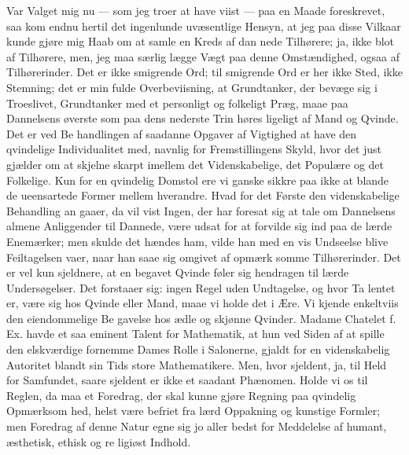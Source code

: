 \documentclass[12pt]{book}
\newcommand{\opage}[1]{\marginnote{\footnotesize\textit{[#1]}}}
\begin{document}
Var Valget mig nu --- som jeg troer at have viist
--- paa en Maade foreskrevet, saa kom endnu hertil det
ingenlunde uvæsentlige Hensyn, at jeg paa disse Vilkaar
kunde gjøre mig Haab om at samle en Kreds af dan\-%
nede Tilhørere; ja, ikke blot af Tilhørere, men,
jeg maa særlig lægge Vægt paa denne Omstændighed,
ogsaa af Tilhørerinder. Det er ikke smigrende Ord; til
smigrende Ord er her ikke Sted, ikke Stemning; det er min
fulde Overbeviisning, at Grundtanker, der bevæge sig i
Troeslivet, Grundtanker med et personligt og folkeligt
Præg, maae paa Dannelsens øverste som paa dens nederste
Trin høres ligeligt af Mand og Qvinde. Det er ved Be\-%
handlingen af saadanne Opgaver af Vigtighed at have den
qvindelige Individualitet med, navnlig for Fremstillingens
Skyld, hvor det just gjælder om at skjelne skarpt imellem
det Videnskabelige, det Populære og det Folkelige. Kun
for en qvindelig Domstol ere vi ganske sikkre paa ikke
at blande de ueensartede Former mellem hverandre.
Hvad for det Første den videnskabelige Behandling an\-%
gaaer, da vil vist Ingen, der har foresat sig at tale om
Dannelsens almene Anliggender til Dannede, være udsat
for at forvilde sig ind paa de lærde Enemærker; men skulde
det hændes ham, vilde han med en vis Undseelse blive
Feiltagelsen vaer, naar han saae sig omgivet af opmærk\-%
somme Tilhørerinder. Det er vel kun sjeldnere, at en
begavet Qvinde føler sig hendragen til lærde Undersøgelser.
Det forstaaer sig: ingen Regel uden Undtagelse, og hvor Ta\-%
lentet er, være sig hos Qvinde eller Mand, maae vi holde
det i Ære. Vi kjende enkeltviis den eiendommelige Be\-%
\opage{284}\setcounter{footnote}{0}%
gavelse hos ædle og skjønne Qvinder. Madame Chatelet
f. Ex. havde et saa eminent Talent for Mathematik, at hun
ved Siden af at spille den elskværdige fornemme Dames Rolle
i Salonerne, gjaldt for en videnskabelig Autoritet blandt sin
Tids store Mathematikere. Men, hvor sjeldent, ja, til
Held for Samfundet, saare sjeldent er ikke et saadant
Phænomen. Holde vi os til Reglen, da maa et Foredrag,
der skal kunne gjøre Regning paa qvindelig Opmærksom\-%
hed, helst være befriet fra lærd Oppakning og kunstige
Formler; men Foredrag af denne Natur egne sig jo aller\-%
bedst for Meddelelse af humant, æsthetisk, ethisk og re\-%
ligiøst Indhold.
\end{document}
